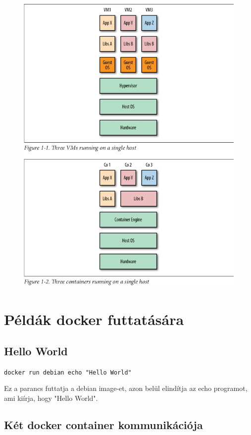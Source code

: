 \documentclass[]{article}
\numberwithin{equation}{section}
\begin{document}
\begin{figure}[H]
	\centering
	\includegraphics[width=0.9\linewidth]{cont_vs_vm}
	\caption{}
	\label{fig:contvsvm}
\end{figure}

\section{Példák docker futtatására}

\subsection{Hello World}

\texttt{docker run debian echo "Hello World"}

Ez a parancs futtatja a debian image-et, azon belül elindítja az echo programot, ami kiírja, hogy "Hello World".

\subsection{Két docker container kommunikációja}
\end{document}
